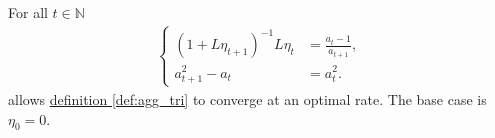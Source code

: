 \documentclass[12pt]{article}
\begin{document}
        \begin{lemma}
            For all $t \in \mathbb N$
            \begin{align*}
                \left\lbrace
                \begin{aligned}
                    (1 + L\eta_{t + 1})^{-1}L \eta_t 
                    &= \frac{a_t - 1}{a_{t + 1}} , 
                    \\
                    a_{t + 1}^2 - a_t &= a_t^2. 
                \end{aligned} 
                \right. 
            \end{align*}
            allows \hyperref[def:agg_tri]{definition \ref*{def:agg_tri}} to converge at an optimal rate. 
            The base case is $\eta_0 = 0$. 
        \end{lemma}
\end{document}
